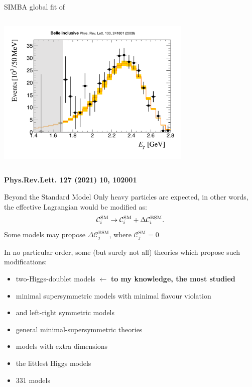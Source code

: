 \documentclass[xcolor=dvipsnames]{beamer}
\begin{document}
\begin{frame}{SIMBA global fit of \BtoXsgamma}
\begin{columns}
         \includegraphics[width=0.7\textwidth]{figures/belle_spec_default_la055_a3.pdf}
      \end{columns}
      \begin{flushright}
         {\tiny\textbf{Phys.Rev.Lett. 127 (2021) 10, 102001}}
      \end{flushright}
   \end{frame}

\begin{frame}{Beyond the Standard Model}
   \small
   Only heavy particles are expected, in other words, the effective Lagrangian would be modified as:
   \begin{equation}\nonumber
      \mathcal{C}_i^{\mathrm{SM}} \rightarrow \mathcal{C}_i^{\mathrm{SM}} + \Delta\mathcal{C}_i^{\mathrm{BSM}}.
   \end{equation}
   Some models may propose $\Delta\mathcal{C}_j^{\mathrm{BSM}}$, where $\mathcal{C}_j^{\mathrm{SM}}=0$

\vspace{10pt}
   In no particular order, some (but surely not all) theories which propose such modifications:
   \begin{itemize}
      \item two-Higgs-doublet models $\leftarrow$ \textbf{to my knowledge, the most studied}
      \item minimal supersymmetric models with minimal flavour violation
      \item and left-right symmetric models
      \item general minimal-supersymmetric theories
      \item models with extra dimensions
      \item the littlest Higgs models
      \item 331 models
   \end{itemize}
\end{frame}
\end{document}
